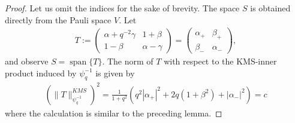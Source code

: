 \documentclass{amsart}
\newcommand{\comments}[1]{}
\DeclareMathOperator{\spann}{span}
\begin{document}
\begin{proof}
    Let us omit the indices for the sake of brevity.
    The space $S$ is obtained directly from the Pauli space $V$. Let
    \begin{align*}
        T := \begin{pmatrix}
            \alpha + q^{-2}\gamma & 1 + \beta \\
            1-\beta & \alpha - \gamma
        \end{pmatrix}
        = \begin{pmatrix}
            \alpha_+ & \beta_+ \\
            \beta_- & \alpha_-
        \end{pmatrix},
    \end{align*}
    and observe $S = \spann \{T\}$.
    The norm of $T$ with respect to the KMS-inner product induced by $\psi_q^{-1}$ is given by 
    \begin{align*}
        \left(\|T\|_{\psi_q^{-1}}^{KMS}\right)^2 
        =\frac{1}{1+q^2} \left( q^2 |\alpha_+|^2 + 2q (1+\beta^2) + |\alpha_-|^2 \right)
        = c
    \end{align*}
    where the calculation is similar to the preceding lemma.
    \comments{
    \begin{align*}
        \left(\|T\|_{\psi_q^{-1}}^{KMS}\right)^2 &= \langle T, T \rangle_{\psi_q^{-1}}^{KMS} \\
            &= \mathrm{Tr}\left( T^\ast \rho_q^{-\frac{1}{2}} T \rho_q^{-\frac{1}{2}} \right) \\
            &= \frac{1}{1+q^2} \mathrm{Tr}\left( T^\ast \begin{pmatrix}
                q & 0 \\
                0 & 1
            \end{pmatrix}
            T
            \begin{pmatrix}
                q & 0 \\
                0 & 1
            \end{pmatrix} \right) \\
            &= \frac{1}{1+q^2} \mathrm{Tr} \left( \begin{pmatrix}
                 q \overline{\alpha_+} & \beta_- \\
                 q \beta_+ & \overline{\alpha_-}
            \end{pmatrix}
            \begin{pmatrix}

\end{pmatrix}
\end{align*}}
\end{proof}
\end{document}

